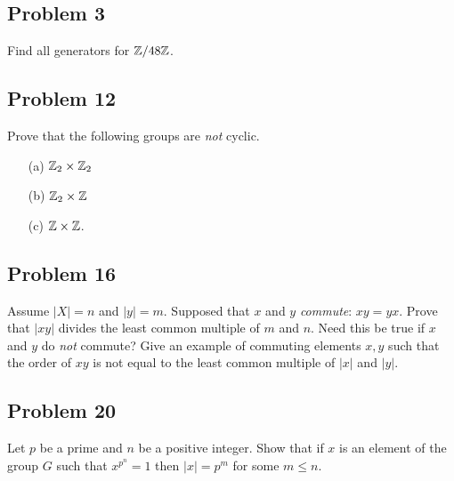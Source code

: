 \subsection{Problem 3}
\begin{prob}
    Find all generators for $\mathbb{Z} /48\mathbb{Z}$.
\end{prob}

\subsection{Problem 12}
\begin{prob}
    Prove that the following groups are \emph{not} cyclic.
    \begin{enumerate}
        \item[(a)] $\mathbb{Z}_2\times \mathbb{Z}_2$
        \item[(b)] $\mathbb{Z}_2\times \mathbb{Z}$
        \item[(c)] $\mathbb{Z}\times \mathbb{Z}$.
    \end{enumerate}
\end{prob}

\subsection{Problem 16}
\begin{prob}
    Assume $|X|=n$ and $|y|=m$. Supposed that $x$ and $y$ \emph{commute}: $xy=yx$. Prove that $|xy|$ divides the least common multiple of $m$ and $n$. Need this be true if $x$ and $y$ do \emph{not} commute? Give an example of commuting elements $x,y$ such that the order of $xy$ is not equal to the least common multiple of $|x|$ and $|y|$.
\end{prob}

\subsection{Problem 20}
\begin{prob}
    Let $p$ be a prime and $n$ be a positive integer. Show that if $x$ is an element of the group $G$ such that $x^{p^n}=1$ then $|x|=p^{m}$ for some $m\leq n$.
\end{prob}

